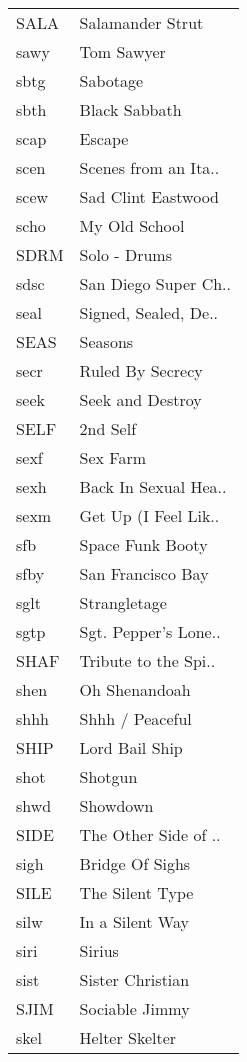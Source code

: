 \begin{supertabular}{ll}
 SALA &      Salamander Strut \\
 sawy &            Tom Sawyer \\
 sbtg &              Sabotage \\
 sbth &         Black Sabbath \\
 scap &                Escape \\
 scen &  Scenes from an Ita.. \\
 scew &    Sad Clint Eastwood \\
 scho &         My Old School \\
 SDRM &          Solo - Drums \\
 sdsc &  San Diego Super Ch.. \\
 seal &  Signed, Sealed, De.. \\
 SEAS &               Seasons \\
 secr &      Ruled By Secrecy \\
 seek &      Seek and Destroy \\
 SELF &              2nd Self \\
 sexf &              Sex Farm \\
 sexh &  Back In Sexual Hea.. \\
 sexm &  Get Up (I Feel Lik.. \\
  sfb &      Space Funk Booty \\
 sfby &     San Francisco Bay \\
 sglt &          Strangletage \\
 sgtp &  Sgt. Pepper's Lone.. \\
 SHAF &  Tribute to the Spi.. \\
 shen &         Oh Shenandoah \\
 shhh &       Shhh / Peaceful \\
 SHIP &        Lord Bail Ship \\
 shot &               Shotgun \\
 shwd &              Showdown \\
 SIDE &  The Other Side of .. \\
 sigh &       Bridge Of Sighs \\
 SILE &       The Silent Type \\
 silw &       In a Silent Way \\
 siri &                Sirius \\
 sist &      Sister Christian \\
 SJIM &        Sociable Jimmy \\
 skel &        Helter Skelter \\

\end{supertabular}
